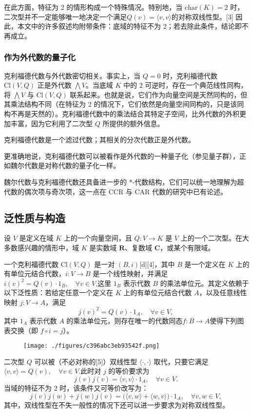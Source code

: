 在此方面，特征为 2 的情形构成一个特殊情况。特别地，当 $\mathrm{char}(K) = 2$ 时，二次型并不一定能够唯一地决定一个满足$Q(v) = \langle v, v \rangle$的对称双线性型。[3] 因此，本文中的许多叙述均附带条件：底域的特征不为 2；若去除此条件，结论即不再成立。
\subsubsection{作为外代数的量子化}
克利福德代数与外代数密切相关。事实上，当 $Q = 0$ 时，克利福德代数 $\mathrm{Cl}(V, Q)$ 正是外代数 $\bigwedge V$。当底域 $K$ 中的 $2$ 可逆时，存在一个典范线性同构，将 $\bigwedge V$ 与 $\mathrm{Cl}(V, Q)$ 联系起来。也就是说，它们作为向量空间是天然同构的，但其乘法结构不同（在特征为 2 的情况下，它们依然是向量空间同构的，只是该同构不再是天然的）。克利福德代数中的乘法结合其特定子空间，比外代数的外积更加丰富，因为它利用了二次型 $Q$ 所提供的额外信息。

克利福德代数是一个滤过代数；其相关的分次代数正是外代数。

更准确地说，克利福德代数可以被看作是外代数的一种量子化（参见量子群），正如魏尔代数是对称代数的量子化一样。

魏尔代数与克利福德代数还具备进一步的 *-代数结构，它们可以统一地理解为超代数的偶次项与奇次项，这一点在 CCR 与 CAR 代数的研究中已有论述。
\subsection{泛性质与构造}
设 $V$ 是定义在域 $K$ 上的一个向量空间，且 $Q : V \to K$ 是 $V$ 上的一个二次型。在大多数感兴趣的情形中，域 $K$ 是实数域 $\mathbf{R}$、复数域 $\mathbf{C}$，或某个有限域。

一个克利福德代数 $\mathrm{Cl}(V, Q)$ 是一对 $(B, i)$[d][4]，其中 $B$ 是一个定义在 $K$ 上的有单位元结合代数，$i : V \to B$ 是一个线性映射，并满足$i(v)^2 = Q(v) \cdot 1_B, \quad \forall v \in V$,这里 $1_B$ 表示代数 $B$ 的乘法单位元。其定义依赖于以下泛性质：若给定任意一个定义在 $K$ 上的有单位元结合代数 $A$，以及任意线性映射 $j : V \to A$，满足
$$
j(v)^2 = Q(v) \cdot 1_A, \quad \forall v \in V,~
$$
其中 $1_A$ 表示代数 $A$ 的乘法单位元，则存在唯一的代数同态$f : B \to A$使得下列图表交换（即 $f \circ i = j$）。
\begin{figure}[ht]
\centering
\texttt{[image: ./figures/c396abc3eb93542f.png]}
\caption{} \label{fig_KLFds_1}
\end{figure}
二次型 $Q$ 可以被（不必对称的[5]）双线性型 $\langle \cdot, \cdot \rangle$ 取代，只要它满足$\langle v, v \rangle = Q(v), \quad \forall v \in V$.此时对 $j$ 的等价要求为
$$
j(v) j(v) = \langle v, v \rangle \cdot 1_A, \quad \forall v \in V.~
$$
当域的特征不为 2 时，该条件又可等价改写为：
$$
j(v) j(w) + j(w) j(v) = \big(\langle v, w \rangle + \langle w, v \rangle\big)\cdot 1_A, \quad \forall v, w \in V,~
$$
其中，双线性型在不失一般性的情况下还可以进一步要求为对称双线性型。

